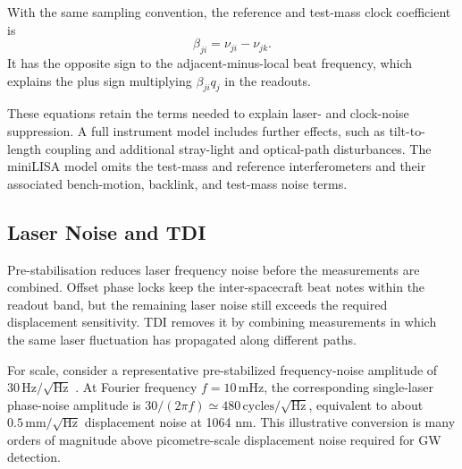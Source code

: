 With the same sampling convention, the reference and test-mass clock coefficient is
\begin{equation}
    \beta_{ji}=\nu_{ji}-\nu_{jk}.
\end{equation}
It has the opposite sign to the adjacent-minus-local beat frequency, which explains the plus sign multiplying $\beta_{ji}q_j$ in the readouts.

These equations retain the terms needed to explain laser- and clock-noise suppression. A full instrument model includes further effects, such as tilt-to-length coupling and additional stray-light and optical-path disturbances. The miniLISA model omits the test-mass and reference interferometers and their associated bench-motion, backlink, and test-mass noise terms.


\subsection{Laser Noise and \ac{TDI}}
Pre-stabilisation reduces laser frequency noise before the measurements are combined. Offset phase locks keep the inter-spacecraft beat notes within the readout band, but the remaining laser noise still exceeds the required displacement sensitivity. TDI removes it by combining measurements in which the same laser fluctuation has propagated along different paths.

For scale, consider a representative pre-stabilized frequency-noise amplitude of $30\,\mathrm{Hz}/\sqrt{\mathrm{Hz}}$ \cite{bayle_unified_2023}. At Fourier frequency $f=10\,\mathrm{mHz}$, the corresponding single-laser phase-noise amplitude is $30/(2\pi f)\simeq480\,\mathrm{cycles}/\sqrt{\mathrm{Hz}}$, equivalent to about $0.5\,\mathrm{mm}/\sqrt{\mathrm{Hz}}$ displacement noise at 1064 nm. This illustrative conversion is many orders of magnitude above picometre-scale displacement noise required for GW detection.

